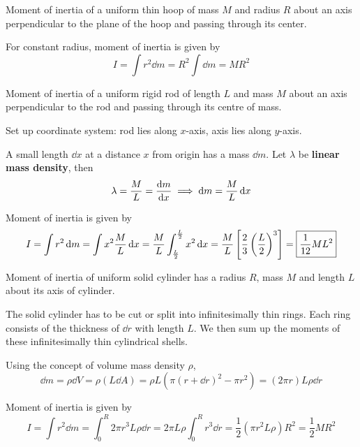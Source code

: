 \begin{exmp}{}{}
Moment of inertia of a uniform thin hoop of mass $M$ and radius $R$ about an axis perpendicular to the plane of the hoop and passing through its center.
\end{exmp}

\begin{solution}
For constant radius, moment of inertia is given by
\[ I = \int r^2 \dd{m} = R^2 \int \dd{m} = \boxed{MR^2} \]
\end{solution}

\begin{exmp}{}{}
Moment of inertia of a uniform rigid rod of length $L$ and mass $M$ about an axis perpendicular to the rod and passing through its centre of mass.
\end{exmp}

\begin{solution}
Set up coordinate system: rod lies along $x$-axis, axis lies along $y$-axis.

A small length $\dd{x}$ at a distance $x$ from origin has a mass $\dd{m}$. Let $\lambda$ be \textbf{linear mass density}, then
\[ \lambda = \frac{M}{L} = \odv{m}{x} \implies \dd{m} = \frac{M}{L} \dd{x} \]

Moment of inertia is given by
\[ I = \int r^2 \dd{m} = \int x^2 \frac{M}{L} \dd{x} = \frac{M}{L} \int_{\frac{L}{2}}^{\frac{L}{2}} x^2\dd{x} = \frac{M}{L}\left[\frac{2}{3}\left(\frac{L}{2}\right)^3\right] = \boxed{\frac{1}{12}ML^2} \]
\end{solution}

\begin{exmp}{}{}
Moment of inertia of uniform solid cylinder has a radius $R$, mass $M$ and length $L$ about its axis of cylinder.
\end{exmp}

\begin{solution}
The solid cylinder has to be cut or split into infinitesimally thin rings. Each ring consists of the thickness of $\dd{r}$ with length $L$. We then sum up the moments of these infinitesimally thin cylindrical shells. 

Using the concept of volume mass density $\rho$,
\[ \dd{m} = \rho \dd{V} = \rho (L \dd{A}) = \rho L (\pi(r+\dd{r})^2 - \pi r^2) = (2\pi r)L\rho\dd{r} \]

Moment of inertia is given by
\[ I = \int r^2 \dd{m} = \int_0^R2\pi r^3 L\rho \dd{r} = 2\pi L\rho \int_0^R r^3 \dd{r} = \frac{1}{2}(\pi r^2L\rho)R^2 = \boxed{\frac{1}{2}MR^2} \]
\end{solution}

